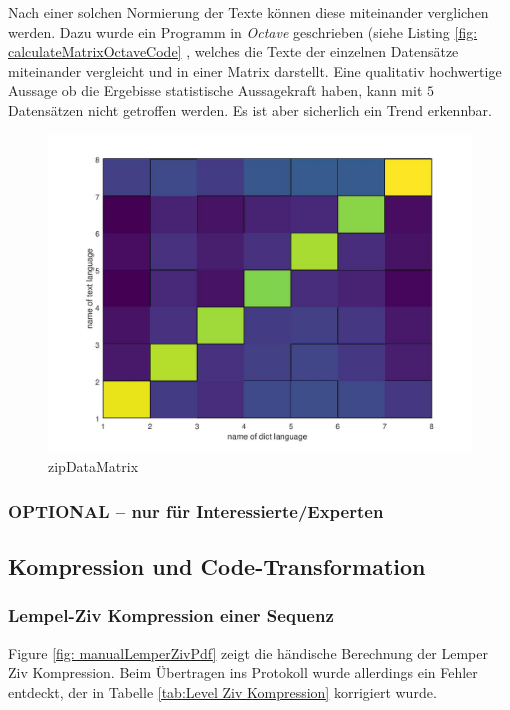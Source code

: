 \documentclass[12pt,german]{article}
\begin{document}


Nach einer solchen Normierung der Texte können diese miteinander verglichen werden. Dazu wurde ein Programm in \textit{Octave} geschrieben (siehe Listing \ref{fig: calculateMatrixOctaveCode}  , welches die Texte der einzelnen Datensätze miteinander vergleicht und in einer Matrix darstellt. Eine qualitativ hochwertige Aussage ob die Ergebisse statistische Aussagekraft haben, kann mit $5$ Datensätzen nicht getroffen werden. Es ist aber sicherlich ein Trend erkennbar.


\begin{figure}[H]
	\centering
	\includegraphics[width=12cm]{images/resultZipData.jpg}
	\caption{zipDataMatrix}
	\label{fig: zipDataMatrix}
\end{figure}

\newpage

\label{fig: calculateMatrixOctaveCode}


\subsubsection{OPTIONAL – nur für Interessierte/Experten}


\subsection{Kompression und Code-Transformation}
\subsubsection{Lempel-Ziv Kompression einer Sequenz}
Figure \ref{fig: manualLemperZivPdf} zeigt die händische Berechnung der Lemper Ziv Kompression. Beim Übertragen ins Protokoll wurde allerdings ein Fehler entdeckt, der in Tabelle \ref{tab:Level Ziv Kompression} korrigiert wurde.
\end{document}
